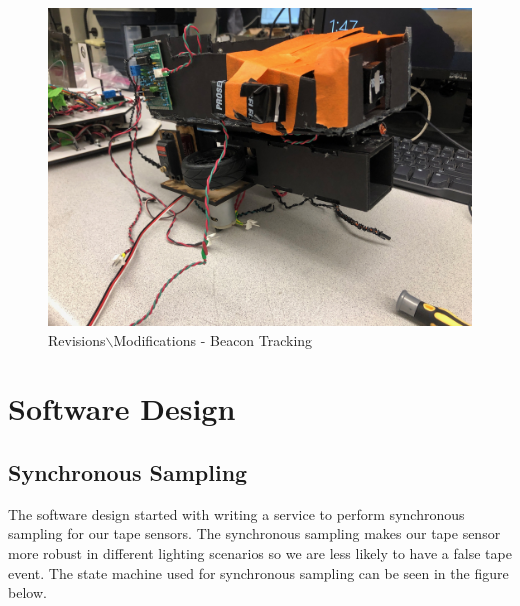 \documentclass{article}
\begin{document}
\begin{figure}[H]
    \centering
    \includegraphics[width = 6in]{BeaconTracking.JPG}
    \caption{Revisions$\backslash{}$Modifications - Beacon Tracking}
    \label{fig:BeaconTracking}
\end{figure}




\section{Software Design}
\doublespacing
\subsection{Synchronous Sampling}
The software design started with writing a service to perform synchronous sampling for our tape sensors.  The synchronous sampling makes our tape sensor more robust in different lighting scenarios so we are less likely to have a false tape event.  The state machine used for synchronous sampling can be seen in the figure below.
\end{document}
